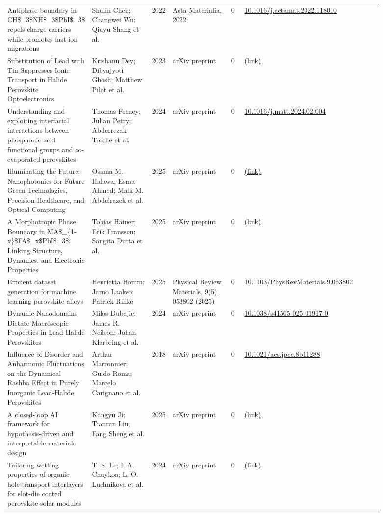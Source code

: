 \documentclass[10pt,a4paper]{article}
\begin{document}
{\begin{longtable}{p{0.197\linewidth}p{0.197\linewidth}p{0.043\linewidth}p{0.197\linewidth}p{0.043\linewidth}p{0.117\linewidth}p{0.098\linewidth}}
Antiphase boundary in CH\$\_3\$NH\$\_3\$PbI\$\_3\$ repels charge carriers while promotes fast ion migrations & Shulin Chen; Changwei Wu; Qiuyu Shang et al. & 2022 & Acta Materialia, 2022 & 0 & \href{https://doi.org/10.1016/j.actamat.2022.118010}{10.1016/j.actamat.2022.118010} &  \\
Substitution of Lead with Tin Suppresses Ionic Transport in Halide Perovskite Optoelectronics & Krishanu Dey; Dibyajyoti Ghosh; Matthew Pilot et al. & 2023 & arXiv preprint & 0 & \href{http://arxiv.org/abs/2305.02014v1}{(link)} &  \\
Understanding and exploiting interfacial interactions between phosphonic acid functional groups and co-evaporated perovskites & Thomas Feeney; Julian Petry; Abderrezak Torche et al. & 2024 & arXiv preprint & 0 & \href{https://doi.org/10.1016/j.matt.2024.02.004}{10.1016/j.matt.2024.02.004} &  \\
Illuminating the Future: Nanophotonics for Future Green Technologies, Precision Healthcare, and Optical Computing & Osama M. Halawa; Esraa Ahmed; Malk M. Abdelrazek et al. & 2025 & arXiv preprint & 0 & \href{http://arxiv.org/abs/2507.06587v1}{(link)} &  \\
A Morphotropic Phase Boundary in MA\$\_\{1-x\}\$FA\$\_x\$PbI\$\_3\$: Linking Structure, Dynamics, and Electronic Properties & Tobias Hainer; Erik Fransson; Sangita Dutta et al. & 2025 & arXiv preprint & 0 & \href{http://arxiv.org/abs/2503.22372v1}{(link)} &  \\
Efficient dataset generation for machine learning perovskite alloys & Henrietta Homm; Jarno Laakso; Patrick Rinke & 2025 & Physical Review Materials, 9(5), 053802 (2025) & 0 & \href{https://doi.org/10.1103/PhysRevMaterials.9.053802}{10.1103/PhysRevMaterials.9.053802} &  \\
Dynamic Nanodomains Dictate Macroscopic Properties in Lead Halide Perovskites & Milos Dubajic; James R. Neilson; Johan Klarbring et al. & 2024 & arXiv preprint & 0 & \href{https://doi.org/10.1038/s41565-025-01917-0}{10.1038/s41565-025-01917-0} &  \\
Influence of Disorder and Anharmonic Fluctuations on the Dynamical Rashba Effect in Purely Inorganic Lead-Halide Perovskites & Arthur Marronnier; Guido Roma; Marcelo Carignano et al. & 2018 & arXiv preprint & 0 & \href{https://doi.org/10.1021/acs.jpcc.8b11288}{10.1021/acs.jpcc.8b11288} &  \\
A closed-loop AI framework for hypothesis-driven and interpretable materials design & Kangyu Ji; Tianran Liu; Fang Sheng et al. & 2025 & arXiv preprint & 0 & \href{http://arxiv.org/abs/2509.18604v1}{(link)} &  \\
Tailoring wetting properties of organic hole-transport interlayers for slot-die coated perovskite solar modules & T. S. Le; I. A. Chuykoa; L. O. Luchnikova et al. & 2024 & arXiv preprint & 0 & \href{http://arxiv.org/abs/2406.08415v1}{(link)} &  \\
\hline
\end{longtable}}
\end{document}
